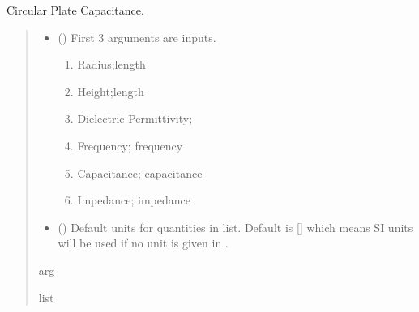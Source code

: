 \documentclass[letterpaper,10pt,english]{sphinxmanual}
\begin{document}
\begin{fulllineitems}
\label{\detokenize{components:components.CircularPlateCap}}
\pysigstartsignatures
{}
\pysigstopsignatures
\sphinxAtStartPar
Circular Plate Capacitance.
\begin{quote}\begin{description}
\begin{itemize}
\item {} 
\sphinxAtStartPar
{} () \textendash{} 
\sphinxAtStartPar
First 3 arguments are inputs.
\begin{enumerate}
%
\item {} 
\sphinxAtStartPar
Radius;length

\item {} 
\sphinxAtStartPar
Height;length

\item {} 
\sphinxAtStartPar
Dielectric Permittivity;

\item {} 
\sphinxAtStartPar
Frequency; frequency

\item {} 
\sphinxAtStartPar
Capacitance; capacitance

\item {} 
\sphinxAtStartPar
Impedance; impedance

\end{enumerate}


\item {} 
\sphinxAtStartPar
{} (\sphinxstyleliteralemphasis{\sphinxupquote{, }}) \textendash{} Default units for quantities in  list. Default is {[}{]} which means SI units will be used if no unit is given in .

\end{itemize}

\sphinxAtStartPar
arg

\sphinxAtStartPar
list

\end{description}\end{quote}

\end{fulllineitems}
\end{document}
